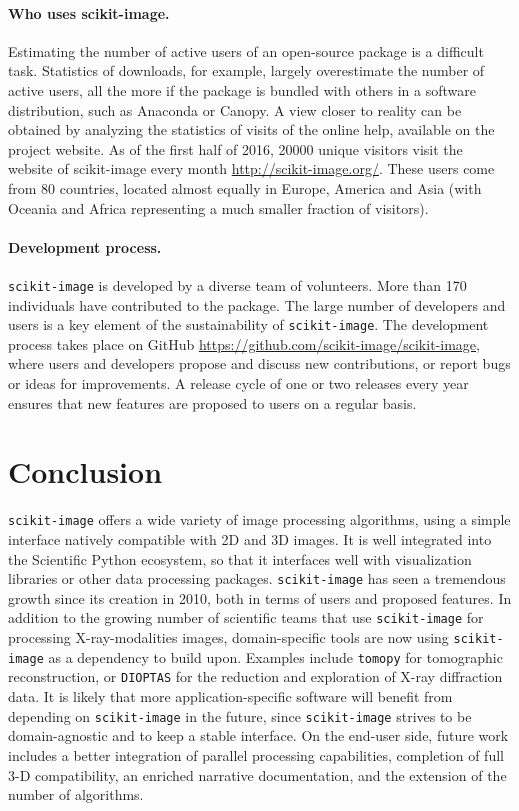 \documentclass[twocolumn]{bmcart}%
\begin{document}
\paragraph{Who uses scikit-image.}

Estimating the number of active users of an open-source package is a
difficult task. Statistics of downloads, for example, largely
overestimate the number of active users, all the more if the package is
bundled with others in a software distribution, such as Anaconda or
Canopy. A view closer to reality can be obtained by analyzing the
statistics of visits of the online help, available on the project
website.  As of the first half of 2016, 20000 unique visitors visit the
website of scikit-image every month \url{http://scikit-image.org/}. These
users come from 80 countries, located almost equally in Europe, America
and Asia (with Oceania and Africa representing a much smaller fraction of
visitors).

\paragraph{Development process.}

\texttt{scikit-image} is developed by a diverse team of volunteers.
More than 170 individuals have contributed to the package. The large
number of developers and users is a key element of the sustainability of
\texttt{scikit-image}. The
development process takes place on GitHub
\url{https://github.com/scikit-image/scikit-image}, where users and
developers propose and discuss new contributions, or report bugs or ideas
for improvements.
A release cycle of one or two releases every year
ensures that new features are proposed to users on a regular basis.

\section*{Conclusion}

\texttt{scikit-image} offers a wide variety of image processing
algorithms, using a simple interface natively compatible with 2D and 3D
images. It is well integrated into the Scientific Python ecosystem, so
that it interfaces well with visualization libraries or other data
processing packages. \texttt{scikit-image} has seen a tremendous growth
since its creation in 2010, both in terms of users and proposed features.
In addition to the growing number of scientific teams that use
\texttt{scikit-image} for processing X-ray-modalities images,
domain-specific tools are now using \texttt{scikit-image} as a dependency
to build upon. Examples include \texttt{tomopy} \citep{Gursoy2014} for
tomographic reconstruction, or \texttt{DIOPTAS} \citep{Prescher2015} for
the reduction and exploration of X-ray diffraction data. It is likely
that more application-specific software will benefit from depending on
\texttt{scikit-image} in the future, since \texttt{scikit-image} strives
to be domain-agnostic and to keep a stable interface. On the end-user
side, future work includes a better integration of parallel processing
capabilities, completion of full 3-D compatibility, an enriched narrative
documentation, and the extension of the number of algorithms.
\end{document}
